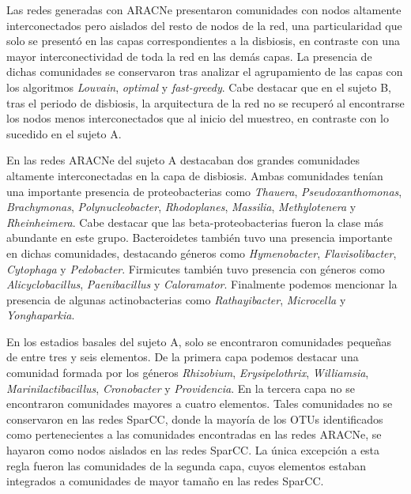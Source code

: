 \documentclass[
]{book}
\begin{document}
Las redes generadas con ARACNe presentaron comunidades con nodos altamente interconectados pero aislados del resto de nodos de la red, una particularidad que solo se presentó en las capas correspondientes a la disbiosis, en contraste con una mayor interconectividad de toda la red en las demás capas. La presencia de dichas comunidades se conservaron tras analizar el agrupamiento de las capas con los algoritmos \emph{Louvain}, \emph{optimal} y \emph{fast-greedy}. Cabe destacar que en el sujeto B, tras el periodo de disbiosis, la arquitectura de la red no se recuperó al encontrarse los nodos menos interconectados que al inicio del muestreo, en contraste con lo sucedido en el sujeto A.

En las redes ARACNe del sujeto A destacaban dos grandes comunidades altamente interconectadas en la capa de disbiosis. Ambas comunidades tenían una importante presencia de proteobacterias como \emph{Thauera}, \emph{Pseudoxanthomonas}, \emph{Brachymonas}, \emph{Polynucleobacter}, \emph{Rhodoplanes}, \emph{Massilia}, \emph{Methylotenera} y \emph{Rheinheimera}. Cabe destacar que las beta-proteobacterias fueron la clase más abundante en este grupo. Bacteroidetes también tuvo una presencia importante en dichas comunidades, destacando géneros como \emph{Hymenobacter}, \emph{Flavisolibacter}, \emph{Cytophaga} y \emph{Pedobacter}. Firmicutes también tuvo presencia con géneros como \emph{Alicyclobacillus}, \emph{Paenibacillus} y \emph{Caloramator}. Finalmente podemos mencionar la presencia de algunas actinobacterias como \emph{Rathayibacter}, \emph{Microcella} y \emph{Yonghaparkia}.

En los estadios basales del sujeto A, solo se encontraron comunidades pequeñas de entre tres y seis elementos. De la primera capa podemos destacar una comunidad formada por los géneros \emph{Rhizobium}, \emph{Erysipelothrix}, \emph{Williamsia}, \emph{Marinilactibacillus}, \emph{Cronobacter} y \emph{Providencia}. En la tercera capa no se encontraron comunidades mayores a cuatro elementos. Tales comunidades no se conservaron en las redes SparCC, donde la mayoría de los OTUs identificados como pertenecientes a las comunidades encontradas en las redes ARACNe, se hayaron como nodos aislados en las redes SparCC. La única excepción a esta regla fueron las comunidades de la segunda capa, cuyos elementos estaban integrados a comunidades de mayor tamaño en las redes SparCC.
\end{document}
